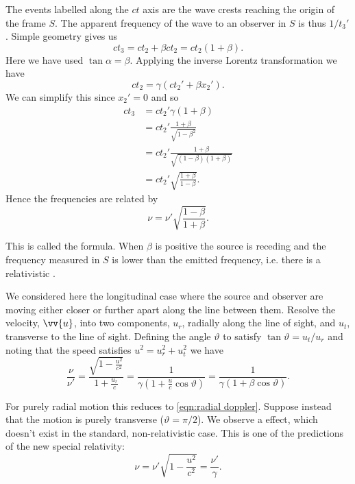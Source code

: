 \documentclass[fleqn]{NotesClass}
\begin{document}
    The events labelled along the \(ct\) axis are the wave crests reaching the origin of the frame \(S\).
    The apparent frequency of the wave to an observer in \(S\) is thus \(1/t_3'\).
    Simple geometry gives us
    \begin{equation}
        ct_3 = ct_2 + \beta ct_2 = ct_2(1 + \beta).
    \end{equation}
    Here we have used \(\tan\alpha = \beta\).
    Applying the inverse Lorentz transformation we have
    \begin{equation}
        ct_2 = \gamma(ct_2' + \beta x_2').
    \end{equation}
    We can simplify this since \(x_2' = 0\) and so
    \begin{align}
        ct_3 &= ct_2'\gamma(1 + \beta)\\
        &= ct_2'\frac{1 + \beta}{\sqrt{1 - \beta^2}}\\
        &= ct_2'\frac{1 + \beta}{\sqrt{(1 - \beta)(1 + \beta)}}\\
        &= ct_2' \sqrt{\frac{1 + \beta}{1 - \beta}}.
    \end{align}
    Hence the frequencies are related by
    \begin{equation}\label{eqn:radial doppler}
        \nu = \nu'\sqrt{\frac{1 - \beta}{1 + \beta}}.
    \end{equation}
    
    This is called the  formula.
    When \(\beta\) is positive the source is receding and the frequency measured in \(S\) is lower than the emitted frequency, i.e. there is a relativistic .
    
    We considered here the longitudinal case where the source and observer are moving either closer or further apart along the line between them.
    Resolve the velocity, \(\vv{u}\), into two components, \(u_r\), radially along the line of sight, and \(u_t\), transverse to the line of sight.
    Defining the angle \(\vartheta\) to satisfy \(\tan\vartheta = u_t/u_r\) and noting that the speed satisfies \(u^2 = u_r^2 + u_t^2\) we have
    \begin{equation}
        \frac{\nu}{\nu'} = \frac{\sqrt{1 - \frac{u^2}{c^2}}}{1 + \frac{u_r}{c}} = \frac{1}{\gamma\left( 1 + \frac{u}{c}\cos\vartheta \right)} = \frac{1}{\gamma(1 + \beta\cos\vartheta)}.
    \end{equation}
    
    For purely radial motion this reduces to \cref{eqn:radial doppler}.
    Suppose instead that the motion is purely transverse (\(\vartheta = \pi/2\)).
    We observe a  effect, which doesn't exist in the standard, non-relativistic case.
    This is one of the predictions of the new special relativity:
    \begin{equation}
        \nu = \nu'\sqrt{1 - \frac{u^2}{c^2}} = \frac{\nu'}{\gamma}.
    \end{equation}
    
\end{document}
